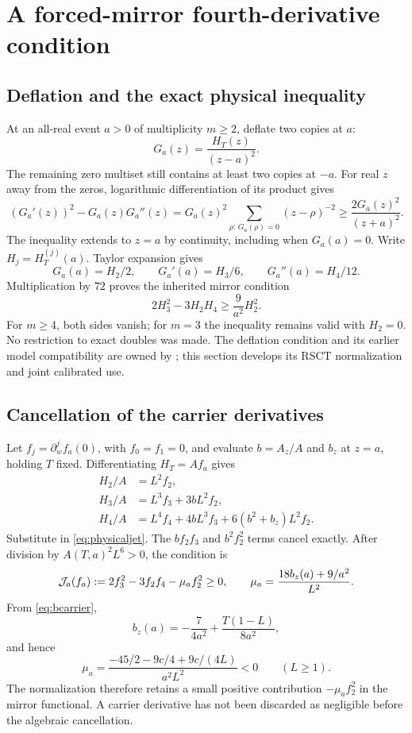 \section{A forced-mirror fourth-derivative condition}\label{sec:mirror}

\subsection{Deflation and the exact physical inequality}

At an all-real event \(a>0\) of multiplicity \(m\ge2\), deflate two
copies at \(a\):
\[
 G_a(z)=\frac{H_T(z)}{(z-a)^2}.
\]
The remaining zero multiset still contains at least two copies at
\(-a\). For real \(z\) away from the zeros, logarithmic differentiation
of its product gives
\[
 (G_a'(z))^2-G_a(z)G_a''(z)
  =G_a(z)^2\sum_{\rho:\,G_a(\rho)=0}(z-\rho)^{-2}
  \ge\frac{2G_a(z)^2}{(z+a)^2}.
\]
The inequality extends to \(z=a\) by continuity, including when \(G_a(a)=0\).
Write \(H_j=H_T^{(j)}(a)\). Taylor expansion gives
\[
 G_a(a)=H_2/2,\qquad G_a'(a)=H_3/6,\qquad G_a''(a)=H_4/12.
\]
Multiplication by \(72\) proves the inherited mirror condition
\begin{equation}\label{eq:physicaljet}
 \boxed{2H_3^2-3H_2H_4\ge\frac9{a^2}H_2^2.}
\end{equation}
For \(m\ge4\), both sides vanish; for \(m=3\) the inequality remains
valid with \(H_2=0\). No restriction to exact doubles was made.
The deflation condition and its earlier model compatibility are owned
by \cite{collision}; this section develops its RSCT normalization and
joint calibrated use.

\subsection{Cancellation of the carrier derivatives}

Let \(f_j=\partial_w^jf_a(0)\), with \(f_0=f_1=0\), and evaluate
\(b=A_z/A\) and \(b_z\) at \(z=a\), holding \(T\) fixed.
Differentiating \(H_T=A f_a\) gives
\begin{align}
 H_2/A&=L^2f_2,\\
 H_3/A&=L^3f_3+3bL^2f_2,\\
 H_4/A&=L^4f_4+4bL^3f_3+6(b^2+b_z)L^2f_2.
\end{align}
Substitute in \eqref{eq:physicaljet}. The \(bf_2f_3\) and \(b^2f_2^2\)
terms cancel exactly. After division by \(A(T,a)^2L^6>0\), the condition is
\begin{equation}\label{eq:Jdef}
 \mathcal J_a(f_a):=2f_3^2-3f_2f_4-\mu_a f_2^2\ge0,
 \qquad \mu_a=\frac{18b_z(a)+9/a^2}{L^2}.
\end{equation}
From \eqref{eq:bcarrier},
\[
 b_z(a)=-\frac7{4a^2}+\frac{T(1-L)}{8a^2},
\]
and hence
\begin{equation}\label{eq:mu}
 \mu_a=\frac{-45/2-9c/4+9c/(4L)}{a^2L^2}<0\qquad(L\ge1).
\end{equation}
The normalization therefore retains a small positive contribution
\(-\mu_a f_2^2\) in the mirror functional. A carrier derivative has
not been discarded as negligible before the algebraic cancellation.

